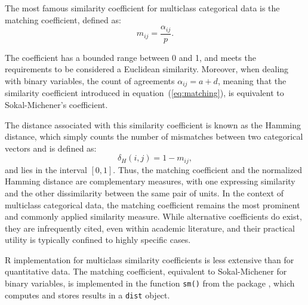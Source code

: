 The most famous similarity coefficient for multiclass categorical data is the matching coefficient, defined as:
\begin{equation}
\label{eq:matching}
    m_{ij} = \frac{\alpha_{ij}}{p}.
\end{equation}

The coefficient has a bounded range between 0 and 1, and %
meets the requirements to be considered a Euclidean similarity. Moreover, when dealing with binary variables, the count of agreements $\alpha_{ij}=a + d$, meaning that the similarity coefficient introduced in equation~(\ref{eq:matching}), is equivalent to Sokal-Michener's coefficient.

The distance associated with this similarity coefficient is known as the Hamming distance, which simply counts the number of mismatches between two categorical vectors and is defined as: 
\begin{equation}
\label{Hamming.dist}
    \delta_H(i,j) = 1 - m_{ij},
\end{equation}
and lies in the interval $[0,1]$. Thus, the matching coefficient and the normalized Hamming distance are complementary measures, with one expressing similarity and the other dissimilarity between the same pair of units. In the context of multiclass categorical data, the matching coefficient remains the most prominent and commonly applied similarity measure. While alternative coefficients do exist, they are infrequently cited, even within academic literature, and their practical utility is typically confined to highly specific cases.

R implementation for multiclass similarity coefficients is less extensive than for quantitative data. The matching coefficient, equivalent to Sokal-Michener for binary variables, is implemented in the function \texttt{sm()} from the  package \citep{nomclust}, which computes and stores results in a \texttt{dist} object.

